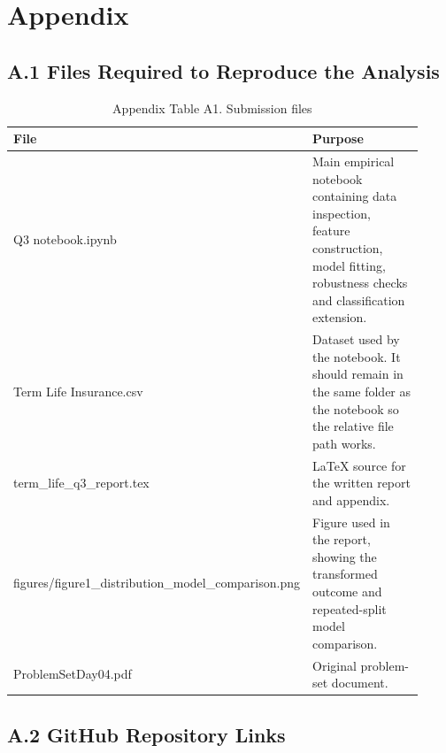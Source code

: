 \documentclass[10pt,a4paper]{article}
\begin{document}
\clearpage
\normalsize
\appendix
\section*{Appendix}

\subsection*{A.1 Files Required to Reproduce the Analysis}

\begin{table}[h]
\centering
\footnotesize
\caption*{Appendix Table A1. Submission files}
\begin{tabular}{>{\raggedright\arraybackslash\ttfamily}p{0.30\linewidth}>{\raggedright\arraybackslash}p{0.62\linewidth}}
\toprule
\normalfont File & \normalfont Purpose \\
\midrule
Q3 notebook.ipynb & Main empirical notebook containing data inspection, feature construction, model fitting, robustness checks and classification extension. \\
Term Life Insurance.csv & Dataset used by the notebook. It should remain in the same folder as the notebook so the relative file path works. \\
term\_life\_q3\_report.tex & LaTeX source for the written report and appendix. \\
figures/figure1\_\allowbreak distribution\_\allowbreak model\_\allowbreak comparison.png & Figure used in the report, showing the transformed outcome and repeated-split model comparison. \\
ProblemSetDay04.pdf & Original problem-set document. \\
\bottomrule
\end{tabular}
\end{table}

\subsection*{A.2 GitHub Repository Links}
\end{document}
